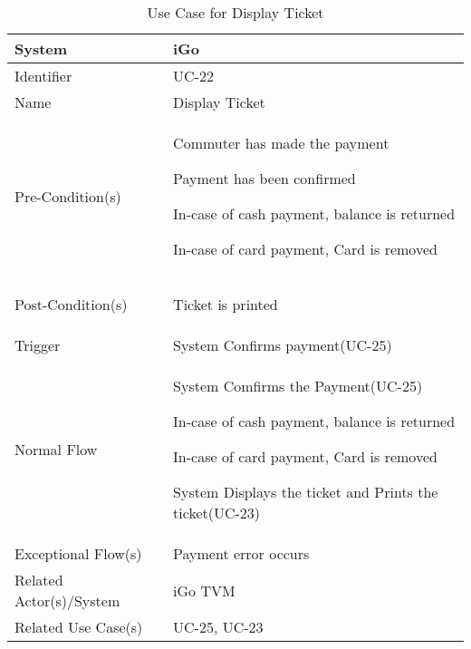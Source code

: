 \begin{table}[ht]
    \centering
    \begin{tabular}{|l|p{10cm}|}
        \hline
        System & iGo\\
        \hline
        Identifier & UC-22 \\
        \hline
        Name & Display Ticket \\
        Pre-Condition(s)   & 
        \begin{enumerate*}[itemjoin=\newline]
            \item Commuter has made the payment
            \item Payment has been confirmed
            \item In-case of cash payment, balance is returned
            \item In-case of card payment, Card is removed
        \end{enumerate*} \\
        \hline
        Post-Condition(s)  & 
        \begin{enumerate*}[itemjoin=\newline]
            \item Ticket is printed
        \end{enumerate*} \\
        \hline
        Trigger            & System Confirms payment(UC-25) \\
        \hline
        Normal Flow        & 
        \begin{enumerate*}[itemjoin=\newline]
            \item System Comfirms the Payment(UC-25) 
             \item In-case of cash payment, balance is returned
            \item In-case of card payment, Card is removed
            \item System Displays the ticket and Prints the ticket(UC-23)
        \end{enumerate*} \\
        \hline
        Exceptional Flow(s) & Payment error occurs \\
        \hline
         Related Actor(s)/System   &  iGo TVM \\
        \hline
        Related Use Case(s) & UC-25, UC-23\\
        \hline
    \end{tabular}
    \caption{Use Case for Display Ticket}
    \label{tab:UC_DisplayTicket}
\end{table}

